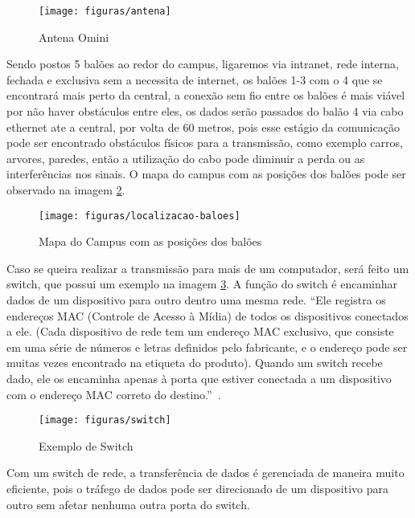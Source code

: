 	\begin{figure}[H]
		\centering
		\caption[Antena Omini]{Antena Omini~\cite{mercadolivre1}}
		\label{img:antenaOmini}
		\texttt{[image: figuras/antena]}
	\end{figure}

  Sendo postos 5 balões ao redor do campus, ligaremos via intranet, rede interna, fechada e exclusiva sem a necessita de internet, os balões 1-3 com o 4 que se encontrará mais perto da central, a conexão sem fio entre os balões é mais viável por não haver obstáculos entre eles, os dados serão passados do balão 4 via cabo ethernet ate a central, por volta de 60 metros, pois esse estágio da comunicação pode ser encontrado obstáculos físicos para a transmissão, como exemplo carros, arvores, paredes, então a utilização do cabo pode diminuir a perda ou as interferências nos sinais. O mapa do campus com as posições dos balões pode ser observado na imagem \ref{img:campusPosicaoCam}.

  \begin{figure}[H]
    \centering
    \caption[Mapa do Campus com as posições dos balões]{Mapa do Campus com as posições dos balões~\cite{mapa1}}
    \label{img:campusPosicaoCam}
    \texttt{[image: figuras/localizacao-baloes]}
  \end{figure}

	Caso se queira realizar a transmissão para mais de um computador, será feito um switch, que possui um exemplo na imagem \ref{img:antenaOmini}. A função do switch é encaminhar dados de um dispositivo para outro dentro uma mesma rede. “Ele registra os endereços MAC (Controle de Acesso à Mídia) de todos os dispositivos conectados a ele. (Cada dispositivo de rede tem um endereço MAC exclusivo, que consiste em uma série de números e letras definidos pelo fabricante, e o endereço pode ser muitas vezes encontrado na etiqueta do produto). Quando um switch recebe dado, ele os encaminha apenas à porta que estiver conectada a um dispositivo com o endereço MAC correto do destino.”~\cite{axis2}.

	\begin{figure}[H]
		\centering
		\caption[Exemplo de Switch]{Exemplo de Switch~\cite{axis2}}
		\label{img:antenaOmini}
		\texttt{[image: figuras/switch]}
	\end{figure}

	Com um switch de rede, a transferência de dados é gerenciada de maneira muito eficiente, pois o tráfego de dados pode ser direcionado de um dispositivo para outro sem afetar nenhuma outra porta do switch.~\cite{axis2}

